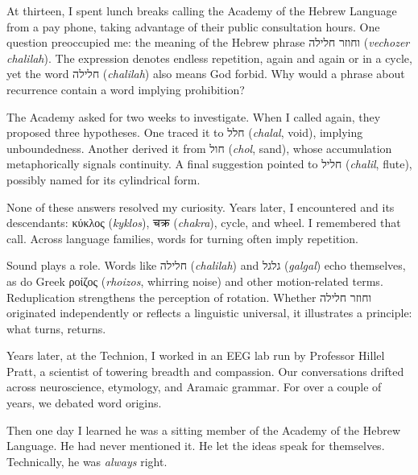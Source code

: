 \begin{commentary}
At thirteen, I spent lunch breaks calling the Academy of the Hebrew Language from a pay phone, taking advantage of their public consultation hours. One question preoccupied me: the meaning of the Hebrew phrase \texthebrew{וחוזר חלילה} (\emph{vechozer chalilah}). The expression denotes endless repetition, \QSOpen{}again and again\QSClose{} or \QSOpen{}in a cycle,\QSClose{} yet the word \texthebrew{חלילה} (\emph{chalilah}) also means \QSOpen{}God forbid.\QSClose{} Why would a phrase about recurrence contain a word implying prohibition?

The Academy asked for two weeks to investigate. When I called again, they proposed three hypotheses. One traced it to \texthebrew{חלל} (\emph{chalal}, \QSOpen{}void\QSClose{}), implying unboundedness. Another derived it from \texthebrew{חול} (\emph{chol}, \QSOpen{}sand\QSClose{}), whose accumulation metaphorically signals continuity. A final suggestion pointed to \texthebrew{חליל} (\emph{chalil}, \QSOpen{}flute\QSClose{}), possibly named for its cylindrical form.

None of these answers resolved my curiosity. Years later, I encountered  and its descendants: \textgreek{κύκλος} (\emph{kyklos}), \textsanskrit{चक्र} (\emph{chakra}), \QSOpen{}cycle,\QSClose{} and \QSOpen{}wheel.\QSClose{} I remembered that call. Across language families, words for turning often imply repetition.

Sound plays a role. Words like \texthebrew{חלילה} (\emph{chalilah}) and \texthebrew{גלגל} (\emph{galgal}) echo themselves, as do Greek \textgreek{ροίζος} (\emph{rhoizos}, \QSOpen{}whirring noise\QSClose{}) and other motion-related terms. Reduplication strengthens the perception of rotation. Whether \texthebrew{וחוזר חלילה} originated independently or reflects a linguistic universal, it illustrates a principle: what turns, returns.

Years later, at the Technion, I worked in an EEG lab run by Professor Hillel Pratt, a scientist of towering breadth and compassion. Our conversations drifted across neuroscience, etymology, and Aramaic grammar. For over a couple of years, we debated word origins.

Then one day I learned he was a sitting member of the Academy of the Hebrew Language. He had never mentioned it. He let the ideas speak for themselves. Technically, he was \textit{always} right.
\end{commentary}

